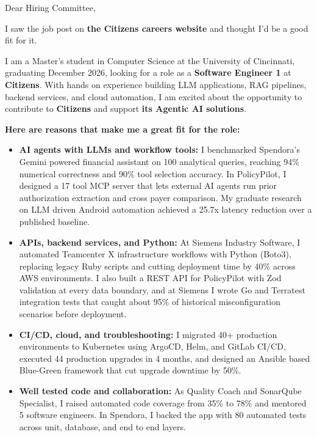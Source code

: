 \documentclass[11pt]{letter}
\date{}
\begin{document}
\begin{letter}{}

\opening{Dear Hiring Committee,}

I saw the job post on \textbf{the Citizens careers website} and thought I'd be a good fit for it.

I am a Master's student in Computer Science at the University of Cincinnati, graduating December 2026, looking for a role as a \textbf{Software Engineer 1} at \textbf{Citizens}. With hands on experience building LLM applications, RAG pipelines, backend services, and cloud automation, I am excited about the opportunity to contribute to \textbf{Citizens} and support \textbf{its Agentic AI solutions}.

\textbf{Here are reasons that make me a great fit for the role:}

\begin{itemize}[leftmargin=*, itemsep=0.45em]
    \item \textbf{AI agents with LLMs and workflow tools:} I benchmarked Spendora's Gemini powered financial assistant on 100 analytical queries, reaching 94\% numerical correctness and 90\% tool selection accuracy. In PolicyPilot, I designed a 17 tool MCP server that lets external AI agents run prior authorization extraction and cross payer comparison. My graduate research on LLM driven Android automation achieved a 25.7x latency reduction over a published baseline.

    \item \textbf{APIs, backend services, and Python:} At Siemens Industry Software, I automated Teamcenter X infrastructure workflows with Python (Boto3), replacing legacy Ruby scripts and cutting deployment time by 40\% across AWS environments. I also built a REST API for PolicyPilot with Zod validation at every data boundary, and at Siemens I wrote Go and Terratest integration tests that caught about 95\% of historical misconfiguration scenarios before deployment.

    \item \textbf{CI/CD, cloud, and troubleshooting:} I migrated 40+ production environments to Kubernetes using ArgoCD, Helm, and GitLab CI/CD, executed 44 production upgrades in 4 months, and designed an Ansible based Blue-Green framework that cut upgrade downtime by 50\%.

    \item \textbf{Well tested code and collaboration:} As Quality Coach and SonarQube Specialist, I raised automated code coverage from 35\% to 78\% and mentored 5 software engineers. In Spendora, I backed the app with 80 automated tests across unit, database, and end to end layers.


\end{itemize}
\end{letter}
\end{document}
